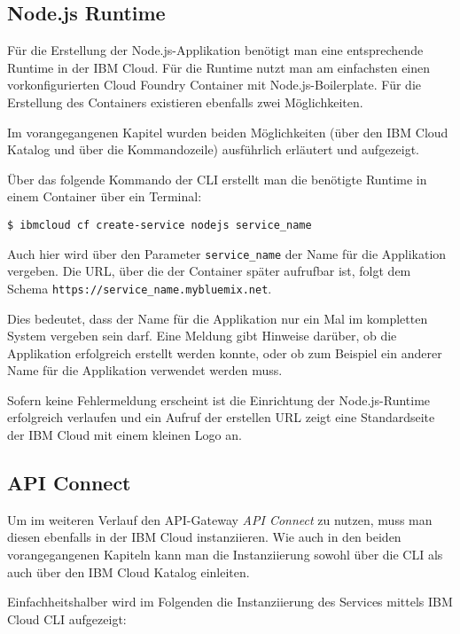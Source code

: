 \subsection{Node.js Runtime}
\label{ssc:nodejs_runtime}
Für die Erstellung der Node.js-Applikation benötigt man eine entsprechende Runtime in der IBM Cloud. Für die Runtime
nutzt man am einfachsten einen vorkonfigurierten Cloud Foundry Container mit Node.js-Boilerplate. Für die Erstellung
des Containers existieren ebenfalls zwei Möglichkeiten.

Im vorangegangenen Kapitel wurden beiden Möglichkeiten (über den IBM Cloud Katalog und über die Kommandozeile)
ausführlich erläutert und aufgezeigt.

Über das folgende Kommando der CLI erstellt man die benötigte Runtime in einem Container über ein Terminal:

\begin{lstlisting}[caption=Instanziierung der Node.js Runtime, label=ls:vorbereitung_nodejstensorflow]
    $ ibmcloud cf create-service nodejs service_name
\end{lstlisting}

Auch hier wird über den Parameter \texttt{service\_name} der Name für die Applikation vergeben. Die URL, über die der
Container später aufrufbar ist, folgt dem Schema \texttt{https://service\_name.mybluemix.net}.

Dies bedeutet, dass der Name für die Applikation nur ein Mal im kompletten System vergeben sein darf. Eine Meldung gibt
Hinweise darüber, ob die Applikation erfolgreich erstellt werden konnte, oder ob zum Beispiel ein anderer Name für die
Applikation verwendet werden muss.

Sofern keine Fehlermeldung erscheint ist die Einrichtung der Node.js-Runtime erfolgreich verlaufen und ein Aufruf der
erstellen URL zeigt eine Standardseite der IBM Cloud mit einem kleinen Logo an.

\subsection{API Connect}
\label{subsec:vorbereitung_apiconnect}
Um im weiteren Verlauf den API-Gateway \textit{API Connect} zu nutzen, muss man diesen ebenfalls in der IBM Cloud
instanziieren. Wie auch in den beiden vorangegangenen Kapiteln kann man die Instanziierung sowohl über die CLI als auch
über den IBM Cloud Katalog einleiten.

Einfachheitshalber wird im Folgenden die Instanziierung des Services mittels IBM Cloud CLI aufgezeigt:

